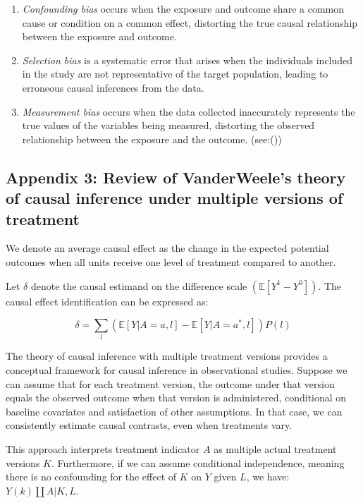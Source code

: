 \documentclass[
  singlecolumn,
  9pt]{article}
\begin{document}
\begin{enumerate}
\def\labelenumi{\alph{enumi}.}
\item
  \emph{Confounding bias} occurs when the exposure and outcome share a
  common cause or condition on a common effect, distorting the true
  causal relationship between the exposure and outcome.
\item
  \emph{Selection bias} is a systematic error that arises when the
  individuals included in the study are not representative of the target
  population, leading to erroneous causal inferences from the data.
\item
  \emph{Measurement bias} occurs when the data collected inaccurately
  represents the true values of the variables being measured, distorting
  the observed relationship between the exposure and the outcome.
  (see:())
\end{enumerate}

\subsection{Appendix 3: Review of VanderWeele's theory of causal
inference under multiple versions of
treatment}\label{appendix-3-review-of-vanderweeles-theory-of-causal-inference-under-multiple-versions-of-treatment}

We denote an average causal effect as the change in the expected
potential outcomes when all units receive one level of treatment
compared to another.

Let \(\delta\) denote the causal estimand on the difference scale
\((\mathbb{E}[Y^1 - Y^0])\). The causal effect identification can be
expressed as:

\[ \delta = \sum_l \left( \mathbb{E}[Y|A=a,l] - \mathbb{E}[Y|A=a^*,l] \right) P(l)\]

The theory of causal inference with multiple treatment versions provides
a conceptual framework for causal inference in observational studies.
Suppose we can assume that for each treatment version, the outcome under
that version equals the observed outcome when that version is
administered, conditional on baseline covariates and satisfaction of
other assumptions. In that case, we can consistently estimate causal
contrasts, even when treatments vary.

This approach interprets treatment indicator \(A\) as multiple actual
treatment versions \(K\). Furthermore, if we can assume conditional
independence, meaning there is no confounding for the effect of \(K\) on
\(Y\) given \(L\), we have: \(Y(k)\coprod A|K,L\).
\end{document}
